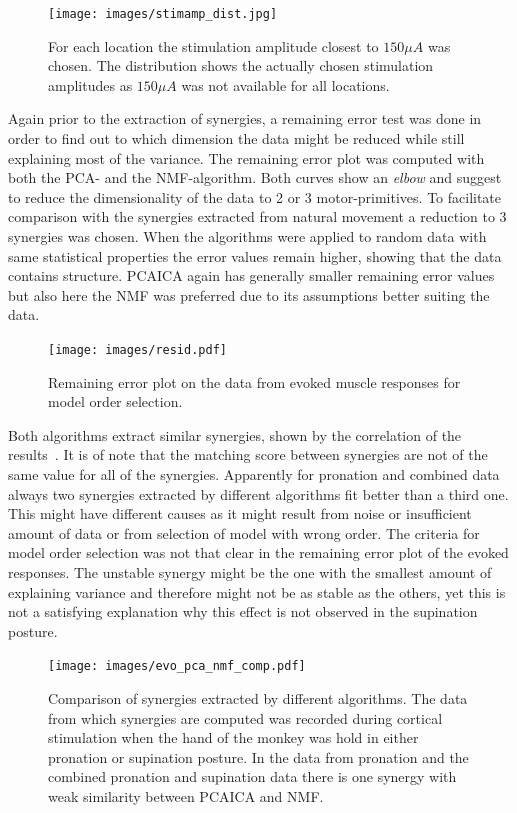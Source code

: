 \begin{figure}[ht]
	\centering
		\texttt{[image: images/stimamp\_dist.jpg]}
	\caption{
		For each location the stimulation amplitude closest to $150 \mu A$ was chosen. The distribution shows the actually chosen stimulation amplitudes as $150 \mu A$ was not available for all locations.}
	\label{sg:fig:stimamp_dist}
\end{figure}

Again prior to the extraction of synergies, a remaining error test was done in order to find out to which dimension the data might be reduced while still explaining most of the variance. The remaining error plot was computed with both the PCA- and the NMF-algorithm. Both curves show an \emph{elbow} and suggest to reduce the dimensionality of the data to 2 or 3 motor-primitives. To facilitate comparison with the synergies extracted from natural movement a
reduction to 3 synergies was chosen. When the algorithms were applied to random data with same statistical properties
the error values remain higher, showing that the data contains structure. PCAICA again has generally smaller remaining
error values but also here the NMF was preferred due to its assumptions better suiting the data. 
\begin{figure}[ht]
	\centering
		\texttt{[image: images/resid.pdf]}
	\caption{Remaining error plot on the data from evoked muscle responses for model order selection. }
	\label{sg:fig:images_resid}
\end{figure}


Both algorithms extract similar synergies, shown by the correlation of the results~. It is of note that
the matching score between synergies are not of the same value for all of the synergies. Apparently for pronation
and combined data always two synergies extracted by different algorithms fit better than a third one.
This might have different causes as it might result from noise or insufficient amount of data or from
selection of model with wrong order. The criteria for model order selection was not that clear in the remaining
error plot of the evoked responses. The unstable synergy might be the one with the smallest amount of explaining variance
and therefore might not be as stable as the others, yet this is not a satisfying explanation why this effect is not observed
in the supination posture.
\begin{figure}[ht]
	\centering
		\texttt{[image: images/evo\_pca\_nmf\_comp.pdf]}
	\caption{Comparison of synergies extracted by different algorithms. The data from which synergies are computed
	was recorded during cortical stimulation when the hand of the monkey was hold in either pronation or supination posture.
	In the data from pronation and the combined pronation and supination data there is one synergy with weak similarity
	between PCAICA and NMF.}
	\label{sg:fig:images_evo_pca_nmf_comp}
\end{figure}


